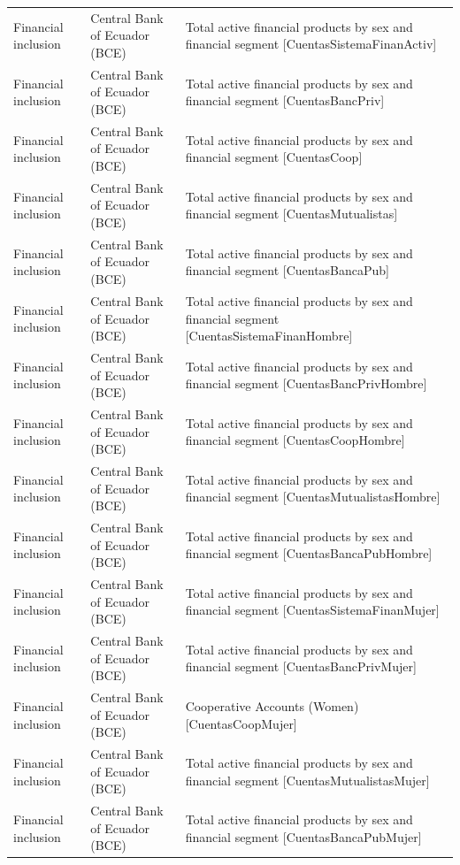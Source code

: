 \documentclass[10pt,a4paper]{article}
\begin{document}
\begin{longtable}{@{}>{\raggedright\arraybackslash}p{3.5cm}>{\raggedright\arraybackslash}p{5.6cm}>{\raggedright\arraybackslash}p{\dimexpr\textwidth-9.1cm-4\tabcolsep\relax}@{}}
Financial inclusion & Central Bank of Ecuador (BCE) & Total active financial products by sex and financial segment [CuentasSistemaFinanActiv]\\
Financial inclusion & Central Bank of Ecuador (BCE) & Total active financial products by sex and financial segment [CuentasBancPriv]\\
Financial inclusion & Central Bank of Ecuador (BCE) & Total active financial products by sex and financial segment [CuentasCoop]\\
Financial inclusion & Central Bank of Ecuador (BCE) & Total active financial products by sex and financial segment [CuentasMutualistas]\\
Financial inclusion & Central Bank of Ecuador (BCE) & Total active financial products by sex and financial segment [CuentasBancaPub]\\
Financial inclusion & Central Bank of Ecuador (BCE) & Total active financial products by sex and financial segment [CuentasSistemaFinanHombre]\\
Financial inclusion & Central Bank of Ecuador (BCE) & Total active financial products by sex and financial segment [CuentasBancPrivHombre]\\
Financial inclusion & Central Bank of Ecuador (BCE) & Total active financial products by sex and financial segment [CuentasCoopHombre]\\
Financial inclusion & Central Bank of Ecuador (BCE) & Total active financial products by sex and financial segment [CuentasMutualistasHombre]\\
Financial inclusion & Central Bank of Ecuador (BCE) & Total active financial products by sex and financial segment [CuentasBancaPubHombre]\\
Financial inclusion & Central Bank of Ecuador (BCE) & Total active financial products by sex and financial segment [CuentasSistemaFinanMujer]\\
Financial inclusion & Central Bank of Ecuador (BCE) & Total active financial products by sex and financial segment [CuentasBancPrivMujer]\\
Financial inclusion & Central Bank of Ecuador (BCE) & Cooperative Accounts (Women) [CuentasCoopMujer]\\
Financial inclusion & Central Bank of Ecuador (BCE) & Total active financial products by sex and financial segment [CuentasMutualistasMujer]\\
Financial inclusion & Central Bank of Ecuador (BCE) & Total active financial products by sex and financial segment [CuentasBancaPubMujer]\\

\end{longtable}
\end{document}
